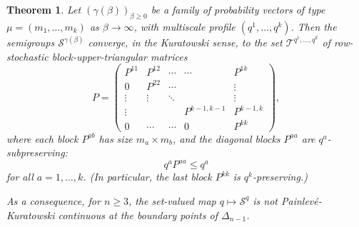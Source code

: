 \documentclass[10pt,a4paper]{amsart}
\newtheorem{thm}{Theorem}
\begin{document}
	\begin{thm}
		\label{thm:general}
		Let $\left(\gamma(\beta)\right)_{\beta\geq0}$ be a family of probability vectors of type $\mu=(m_1,\ldots,m_k)$ as $\beta\to\infty$, with multiscale profile $(q^1,\ldots,q^k)$. Then the semigroups $\mathcal{S}^{\gamma(\beta)}$
		converge, in the Kuratowski sense, to the set $\mathcal T^{q^1,\ldots,q^k}$ of row-stochastic block-upper-triangular matrices 
		\begin{equation}
			P=
			\begin{pmatrix}
				P^{11} & P^{12} & \cdots & \cdots & P^{1k}\\
				0 & P^{22} & \cdots & & \vdots\\
				\vdots & \vdots & \ddots & & \vdots\\
				\vdots & & & P^{k-1,k-1} & P^{k-1,k}\\
				0 & \cdots & \cdots & 0 & P^{kk}
			\end{pmatrix},
		\end{equation}
		where each block $P^{ab}$ has size $m_a\times m_b$, and the diagonal blocks $P^{aa}$ are $q^a$-subpreserving:
		\begin{equation}
			q^aP^{aa}\leq q^a
		\end{equation}
		for all $a=1,\ldots,k$. (In particular, the last block $P^{kk}$ is $q^k$-preserving.)
		
		As a consequence,  for $n\geq3$, the set-valued map $q\mapsto \mathcal{S}^q$ is not Painlev\'e-Kuratowski continuous at the boundary points of $\Delta_{n-1}$. 
	\end{thm}
\end{document}
